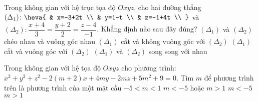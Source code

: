 \begin{ex}%
	Trong không gian với hệ trục tọa độ $Oxyz$, cho hai đường thẳng $(\Delta_1)\colon\heva{
			& x=-3+2t \\ 
			& y=1-t \\ 
			& z=-1+4t \\ }$ và $(\Delta_2)\colon \dfrac{x+4}{3}=\dfrac{y+2}{2}=\dfrac{z-4}{-1}$. Khẳng định nào sau đây đúng?
		\choice
		{$(\Delta_1)$ và $(\Delta_2)$ chéo nhau và vuông góc nhau}
		{$(\Delta_1)$ cắt và không vuông góc với $(\Delta_2)$}
		{\True $(\Delta_1)$ cắt và vuông góc với $(\Delta_2)$}
		{$(\Delta_1)$ và $(\Delta_2)$ song song với nhau}
	\end{ex}
\begin{ex}%
	Trong không gian với hệ tọa độ $Oxyz$ cho phương trình: ${x}^2+y^2+z^2-2\left(m+2\right)x+4my-2mz+5m^2+9=0$. Tìm $m$ để phương trình trên là phương trình của một mặt cầu 
	\choice
	{$-5<m<1$}
	{\True $m<-5$ hoặc $m>1$}
	{$m<-5$}
	{$m>1$}
\end{ex}
